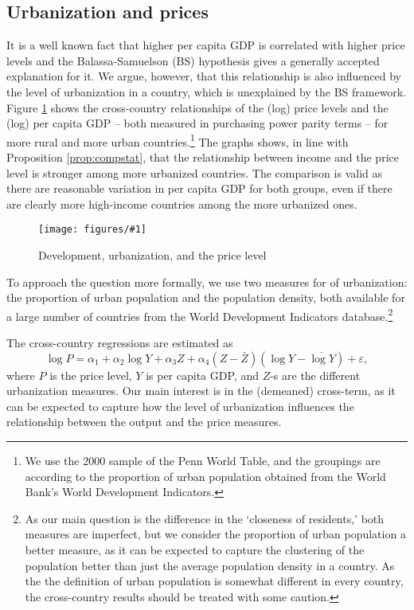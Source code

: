 \documentclass[12pt]{article}
\newcommand{\dofigure}[2]{\begin{figure}
\begin{centering}
\texttt{[image: figures/\#1]}
  \caption{#2\label{fig:#1}}
\end{centering}
\end{figure}}
\begin{document}
\subsection{Urbanization and prices}
It is a well known fact that higher per capita GDP is correlated with higher price levels and the Balassa-Samuelson (BS) hypothesis gives a generally accepted explanation for it. We argue, however, that this relationship is also influenced by the level of urbanization in a country, which is unexplained by the BS framework. Figure \ref{fig:sc_penn} shows the cross-country relationships of the (log) price levels and the (log) per capita GDP -- both measured in purchasing power parity terms -- for more rural and more urban countries.\footnote{We use the 2000 sample of the Penn World Table, and the groupings are according to the proportion of urban population obtained from the World Bank's World Development Indicators.} The graphs shows, in line with Proposition \ref{prop:compstat}, that the relationship between income and the price level is stronger among more urbanized countries. The comparison is valid as there are reasonable variation in per capita GDP for both groups, even if there are clearly more high-income countries among the more urbanized ones.

\dofigure{sc_penn}{Development, urbanization, and the price level}

To approach the question more formally, we use two measures for of urbanization: the proportion of urban population and the population density, both available for a large number of countries from the World Development Indicators database.\footnote{As our main question is the difference in the `closeness of residents,' both measures are imperfect, but we consider the proportion of urban population a better measure, as it can be expected to capture the clustering of the population better than just the average population density in a country. As the the definition of urban population is somewhat different in every country, the cross-country results should be treated with some caution.}

The cross-country regressions are estimated as
\begin{equation}
\log{P}=\alpha_1+\alpha_2\log Y+\alpha_3Z+\alpha_4(Z-\bar{Z})(\log Y-\overline{\log Y})+\varepsilon,
\end{equation}
where $P$ is the price level, $Y$ is per capita GDP, and $Z$-s are the different urbanization measures. Our main interest is in the (demeaned) cross-term, as it can be expected to capture how the level of urbanization influences the relationship between the output and the price measures.
\end{document}
